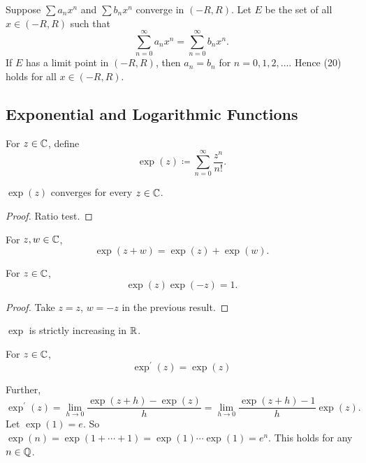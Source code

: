 \begin{proposition}
Suppose $\sum a_nx^n$ and $\sum b_nx^n$ converge in $(-R,R)$. Let $E$ be the set of all $x\in(-R,R)$ such that
\[\sum_{n=0}^{\infty}a_nx^n=\sum_{n=0}^{\infty}b_nx^n.\]
If $E$ has a limit point in $(-R,R)$, then $a_n=b_n$ for $n=0,1,2,\dots$. Hence (20) holds for all $x\in(-R,R)$. 
\end{proposition}
\pagebreak

\subsection{Exponential and Logarithmic Functions}
\begin{definition}
For $z\in\mathbb C$, define
\begin{equation}\label{eqn:exponential-function}
\exp(z)\coloneqq\sum_{n=0}^\infty\frac{z^n}{n!}.
\end{equation}
\end{definition}

\begin{proposition}
$\exp(z)$ converges for every $z\in\mathbb C$.
\end{proposition}

\begin{proof}
Ratio test.
\end{proof}

\begin{proposition}
For $z,w\in\mathbb C$,
\[\exp(z+w)=\exp(z)+\exp(w).\]
\end{proposition}

\begin{corollary}
For $z\in\mathbb C$,
\[\exp(z)\exp(-z)=1.\]
\end{corollary}

\begin{proof}
Take $z=z$, $w=-z$ in the previous result.
\end{proof}

\begin{proposition}
$\exp$ is strictly increasing in $\mathbb R$.
\end{proposition}

\begin{proposition}
For $z\in\mathbb C$,
\[\exp^\prime(z)=\exp(z)\]
\end{proposition}

Further,
\[\exp^\prime(z)=\lim_{h\to0}\frac{\exp(z+h)-\exp(z)}{h}=\lim_{h\to0}\frac{\exp(z+h)-1}{h}\exp(z).\]
Let $\exp(1)=e$. So $\exp(n)=\exp(1+\cdots+1)=\exp(1)\cdots\exp(1)=e^n$. This holds for any $n\in\mathbb Q$.
\pagebreak


